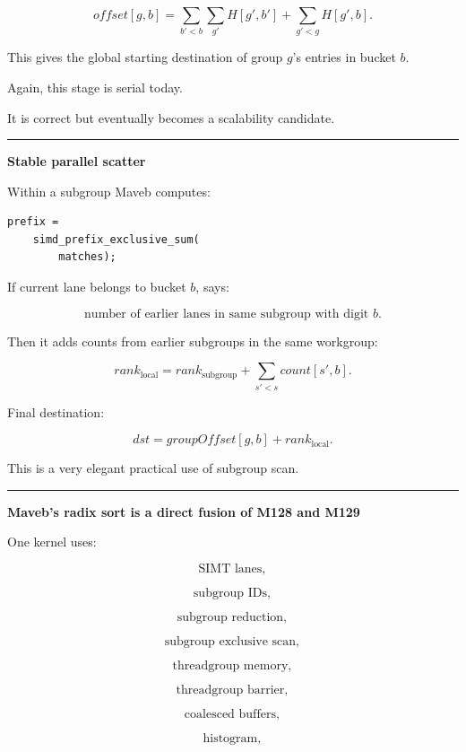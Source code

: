 \[
offset[g,b]
=
\sum_{b'<b}
\sum_{g'}H[g',b']
+
\sum_{g'<g}H[g',b].
\]

This gives the global starting destination of group \(g\)'s entries in bucket \(b\).

Again, this stage is serial today.

It is correct but eventually becomes a scalability candidate.

\begin{center}\rule{0.5\linewidth}{0.5pt}\end{center}

\textbf{Stable parallel scatter}

Within a subgroup Maveb computes:

\protect{}\label{bypw71}%
\begin{verbatim}
prefix =
    simd_prefix_exclusive_sum(
        matches);
\end{verbatim}

If current lane belongs to bucket \(b\),  says:

\[
\text{number of earlier lanes in same subgroup with digit }b.
\]

Then it adds counts from earlier subgroups in the same workgroup:

\[
rank_{\text{local}}
=
rank_{\text{subgroup}}
+
\sum_{s'<s}
count[s',b].
\]

Final destination:

\[
\boxed{
dst=
groupOffset[g,b]
+
rank_{\text{local}}.
}
\]

This is a very elegant practical use of subgroup scan.

\begin{center}\rule{0.5\linewidth}{0.5pt}\end{center}

\textbf{Maveb's radix sort is a direct fusion of M128 and M129}

One kernel uses:

\[
\text{SIMT lanes},
\]

\[
\text{subgroup IDs},
\]

\[
\text{subgroup reduction},
\]

\[
\text{subgroup exclusive scan},
\]

\[
\text{threadgroup memory},
\]

\[
\text{threadgroup barrier},
\]

\[
\text{coalesced buffers},
\]

\[
\text{histogram},
\]

